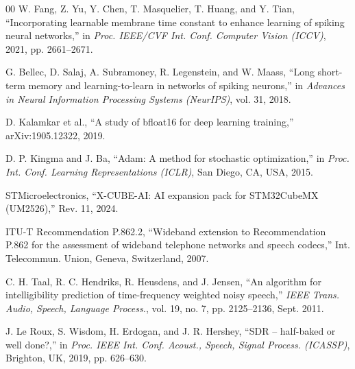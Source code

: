 \documentclass[conference]{IEEEtran}
\begin{document}
\begin{thebibliography}{00}
W. Fang, Z. Yu, Y. Chen, T. Masquelier, T. Huang, and Y. Tian,
``Incorporating learnable membrane time constant to enhance learning of spiking neural networks,''
in \emph{Proc. IEEE/CVF Int. Conf. Computer Vision (ICCV)}, 2021, pp. 2661--2671.

G. Bellec, D. Salaj, A. Subramoney, R. Legenstein, and W. Maass,
``Long short-term memory and learning-to-learn in networks of spiking neurons,''
in \emph{Advances in Neural Information Processing Systems (NeurIPS)}, vol. 31, 2018.

D. Kalamkar et al.,
``A study of bfloat16 for deep learning training,''
arXiv:1905.12322, 2019.

D. P. Kingma and J. Ba,
``Adam: A method for stochastic optimization,''
in \emph{Proc. Int. Conf. Learning Representations (ICLR)}, San Diego, CA, USA, 2015.

STMicroelectronics,
``X-CUBE-AI: AI expansion pack for STM32CubeMX (UM2526),''
Rev. 11, 2024.

ITU-T Recommendation P.862.2,
``Wideband extension to Recommendation P.862 for the assessment of wideband telephone networks and speech codecs,''
Int. Telecommun. Union, Geneva, Switzerland, 2007.

C. H. Taal, R. C. Hendriks, R. Heusdens, and J. Jensen,
``An algorithm for intelligibility prediction of time-frequency weighted noisy speech,''
\emph{IEEE Trans. Audio, Speech, Language Process.}, vol. 19, no. 7, pp. 2125--2136, Sept. 2011.

J. Le Roux, S. Wisdom, H. Erdogan, and J. R. Hershey,
``SDR -- half-baked or well done?,''
in \emph{Proc. IEEE Int. Conf. Acoust., Speech, Signal Process. (ICASSP)}, Brighton, UK, 2019, pp. 626--630.




\end{thebibliography}
\vspace{12pt}
\end{document}
